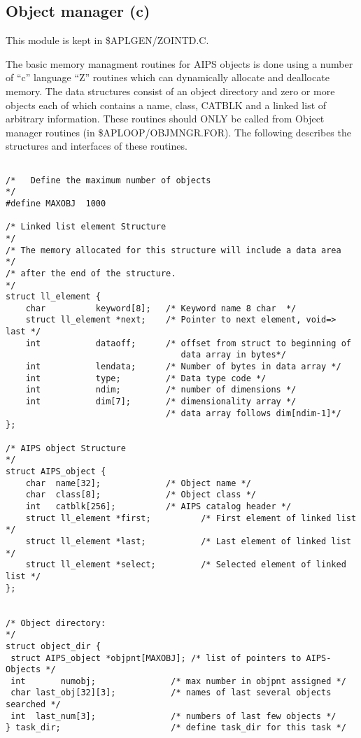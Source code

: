 \subsection{Object manager (c) }

   This module is kept in \$APLGEN/ZOINTD.C.

   The basic memory managment routines for AIPS objects is done using
a number of ``c'' language ``Z'' routines which can dynamically
allocate and deallocate memory.
The data structures
consist of an object directory and zero or more objects each of
which contains a name, class, CATBLK and a linked list of
arbitrary information.  These routines should ONLY be called from
Object manager routines (in \$APLOOP/OBJMNGR.FOR).  The following
describes the structures and interfaces of these routines.
{\small\begin{verbatim}

/*   Define the maximum number of objects                             */
#define MAXOBJ  1000

/* Linked list element Structure                                      */
/* The memory allocated for this structure will include a data area   */
/* after the end of the structure.                                    */
struct ll_element {
    char          keyword[8];   /* Keyword name 8 char  */
    struct ll_element *next;    /* Pointer to next element, void=> last */
    int           dataoff;      /* offset from struct to beginning of
                                   data array in bytes*/
    int           lendata;      /* Number of bytes in data array */
    int           type;         /* Data type code */
    int           ndim;         /* number of dimensions */
    int           dim[7];       /* dimensionality array */
                                /* data array follows dim[ndim-1]*/
};

/* AIPS object Structure                                              */
struct AIPS_object {
    char  name[32];             /* Object name */
    char  class[8];             /* Object class */
    int   catblk[256];          /* AIPS catalog header */
    struct ll_element *first;          /* First element of linked list */
    struct ll_element *last;           /* Last element of linked list */
    struct ll_element *select;         /* Selected element of linked list */
};


/* Object directory:                                                  */
struct object_dir {
 struct AIPS_object *objpnt[MAXOBJ]; /* list of pointers to AIPS-Objects */
 int       numobj;               /* max number in objpnt assigned */
 char last_obj[32][3];           /* names of last several objects searched */
 int  last_num[3];               /* numbers of last few objects */
} task_dir;                      /* define task_dir for this task */


\end{verbatim}}

